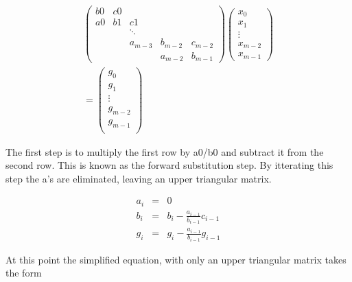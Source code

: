 \documentclass[twocolumn, groupedaddress]{revtex4-1}
\begin{document}
\begin{align}
\label{eqn: mat system}
\left( \begin{array}{ccccc}
	 b0 & c0 &        &         &         \\
	a0 &  b1 &  c1    &         &         \\
	   &    & \ddots  &         &         \\
	   &	    & a_{m-3} & b_{m-2} & c_{m-2} \\
	   &    &         & a_{m-2} & b_{m-1}
   \end{array} \right)
\left( \begin{array}{c}
	x_0     \\
	x_1     \\
	\vdots  \\
	x_{m-2} \\
	x_{m-1}
   \end{array} \right) \nonumber
 \\ =
\left( \begin{array}{c}
	g_0     \\
	g_1     \\
	\vdots  \\
	g_{m-2} \\
	g_{m-1} \\
   \end{array} \right)
\end{align}

The first step is to multiply the first row by a0/b0 and subtract it from the second row.  This is known as the forward substitution step.  By itterating this step the a's are eliminated, leaving an upper triangular matrix.

\begin{equation}
\begin{aligned}
	a_i &=& 0                                    \\
	b_i &=& b_i - \frac{a_{i-1}}{b_{i-1}}c_{i-1} \\
	g_i &=& g_i - \frac{a_{i-1}}{b_{i-1}}g_{i-1}
\end{aligned}
\end{equation}

At this point the simplified equation, with only an upper triangular matrix takes the form
\end{document}
